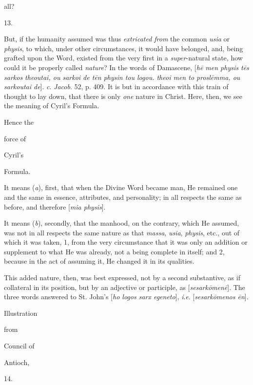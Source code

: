 all?

13.

But, if
the humanity assumed was thus \emph{extricated from} the
common \emph{usia} or \emph{physis}, to which, under other
circumstances, it would have belonged, and, being grafted upon
the Word, existed from the very first in a \emph{super}-natural
state, how could it be properly called \emph{nature}? In the
words of Damascene, [\emph{h\={e} men physis t\={e}s sarkos
theoutai, ou sarkoi de t\={e}n physin tou logou. theoi men
to prosl\={e}mma, ou sarkoutai de}]. \emph{c}. \emph{Jacob}.
52, p. 409. It is but in accordance with this train of
thought to lay down, that there is only \emph{one} nature in
Christ. Here, then, we see the meaning of Cyril's Formula.

Hence the

force of

Cyril's

Formula.

It means (\emph{a}),
first, that when the Divine Word became man, He remained one
and the same in essence, attributes, and personality; in all
respects the same as before, and therefore [\emph{mia physis}].

It
means (\emph{b}), secondly, that the manhood, on the contrary,
which He assumed, was not in all respects the same nature as
that \emph{massa}, \emph{usia}, \emph{physis}, etc., out of
which it was taken, 1, from the very circumstance that it was
only an addition or supplement to what He was already, not a
being complete in itself; and 2, because in the act of
assuming it, He changed it in its qualities.

This added nature,
then, was best expressed, not by a second substantive, as if
collateral in its position, but by an adjective or participle,
as [\emph{sesark\={o}men\={e}}]. The three words
answered to St. John's [\emph{ho logos sarx egeneto}], \emph{i}.\emph{e}.
[\emph{sesark\={o}menos \={e}n}].

Illustration 

from

Council of

Antioch,

14.

